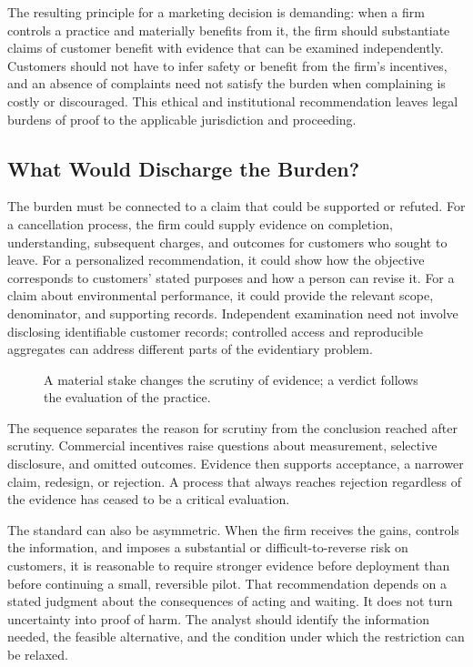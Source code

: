 The resulting principle for a marketing decision is demanding: when a
firm controls a practice and materially benefits from it, the firm
should substantiate claims of customer benefit with evidence that can be
examined independently. Customers should not have to infer safety or
benefit from the firm's incentives, and an absence of complaints need
not satisfy the burden when complaining is costly or discouraged. This
ethical and institutional recommendation leaves legal burdens of proof
to the applicable jurisdiction and proceeding.

\hypertarget{M09-what-would-discharge-the-burden}{%
\subsection{What Would Discharge the
Burden?}\label{M09-what-would-discharge-the-burden}}

\noindent \noindent The burden must be connected to a claim that could be
supported or refuted. For a cancellation process, the firm could supply
evidence on completion, understanding, subsequent charges, and outcomes
for customers who sought to leave. For a personalized recommendation, it
could show how the objective corresponds to customers' stated purposes
and how a person can revise it. For a claim about environmental
performance, it could provide the relevant scope, denominator, and
supporting records. Independent examination need not involve disclosing
identifiable customer records; controlled access and reproducible
aggregates can address different parts of the evidentiary problem.

\begin{figure}[htbp]
\centering

\caption{A material stake changes the scrutiny of evidence; a verdict follows the evaluation of the practice.}\label{fig:M09_burden_justification}
\end{figure}

The sequence separates the reason for scrutiny from the conclusion
reached after scrutiny. Commercial incentives raise questions about
measurement, selective disclosure, and omitted outcomes. Evidence then
supports acceptance, a narrower claim, redesign, or rejection. A process
that always reaches rejection regardless of the evidence has ceased to
be a critical evaluation.

The standard can also be asymmetric. When the firm receives the gains,
controls the information, and imposes a substantial or
difficult-to-reverse risk on customers, it is reasonable to require
stronger evidence before deployment than before continuing a small,
reversible pilot. That recommendation depends on a stated judgment about
the consequences of acting and waiting. It does not turn uncertainty
into proof of harm. The analyst should identify the information needed,
the feasible alternative, and the condition under which the restriction
can be relaxed.

